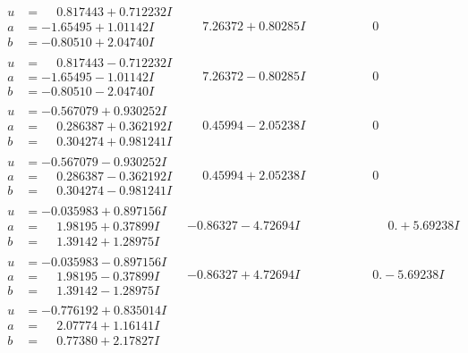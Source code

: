 \documentclass[1p]{elsarticle_modified}
\theoremstyle{definition}
\begin{document}
$$\begin{array}{c|c|c}
\begin{aligned}
u &= \phantom{-}0.817443 + 0.712232 I \\
a &= -1.65495 + 1.01142 I \\
b &= -0.80510 + 2.04740 I\end{aligned}
 & \phantom{-}7.26372 + 0.80285 I & \phantom{-0.000000 } 0 \\ \hline\begin{aligned}
u &= \phantom{-}0.817443 - 0.712232 I \\
a &= -1.65495 - 1.01142 I \\
b &= -0.80510 - 2.04740 I\end{aligned}
 & \phantom{-}7.26372 - 0.80285 I & \phantom{-0.000000 } 0 \\ \hline\begin{aligned}
u &= -0.567079 + 0.930252 I \\
a &= \phantom{-}0.286387 + 0.362192 I \\
b &= \phantom{-}0.304274 + 0.981241 I\end{aligned}
 & \phantom{-}0.45994 - 2.05238 I & \phantom{-0.000000 } 0 \\ \hline\begin{aligned}
u &= -0.567079 - 0.930252 I \\
a &= \phantom{-}0.286387 - 0.362192 I \\
b &= \phantom{-}0.304274 - 0.981241 I\end{aligned}
 & \phantom{-}0.45994 + 2.05238 I & \phantom{-0.000000 } 0 \\ \hline\begin{aligned}
u &= -0.035983 + 0.897156 I \\
a &= \phantom{-}1.98195 + 0.37899 I \\
b &= \phantom{-}1.39142 + 1.28975 I\end{aligned}
 & -0.86327 - 4.72694 I & \phantom{-0.000000 -}0. + 5.69238 I \\ \hline\begin{aligned}
u &= -0.035983 - 0.897156 I \\
a &= \phantom{-}1.98195 - 0.37899 I \\
b &= \phantom{-}1.39142 - 1.28975 I\end{aligned}
 & -0.86327 + 4.72694 I & \phantom{-0.000000 } 0. - 5.69238 I \\ \hline\begin{aligned}
u &= -0.776192 + 0.835014 I \\
a &= \phantom{-}2.07774 + 1.16141 I \\
b &= \phantom{-}0.77380 + 2.17827 I\end{aligned}

\end{array}$$
\end{document}
